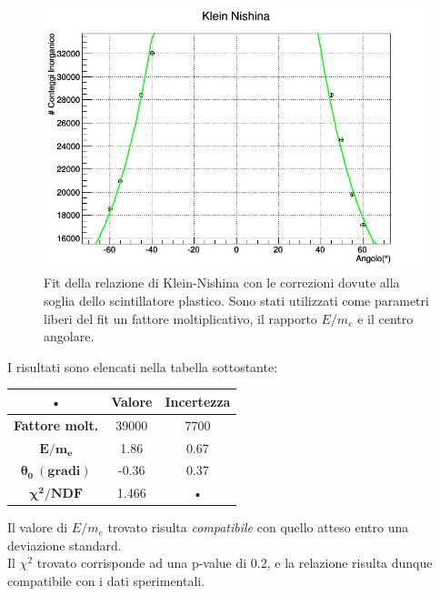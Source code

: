 \documentclass[8pt]{extarticle}
\begin{document}
\begin{figure}
\begin{center}
\includegraphics[scale=0.5]{klein_nishina_corretta}
\caption{Fit della relazione di Klein-Nishina con le correzioni dovute alla soglia dello scintillatore plastico. Sono stati utilizzati come parametri liberi del fit un fattore moltiplicativo, il rapporto $E/m_e$ e il centro angolare.}
\label{fig:KN_corr}
\end{center}
\end{figure}

I risultati sono elencati nella tabella sottostante: \\

\begin{center}
\begin{tabular}{|c|c|c|}
\hline 
• & \textbf{Valore} & \textbf{Incertezza} \\ 
\hline 
\textbf{Fattore molt.} & 39000 & 7700 \\ 
\hline 
$\mathbf{E/m_e}$ & 1.86 & 0.67 \\ 
\hline 
$\mathbf{\theta_0\ (gradi)}$ & -0.36 & 0.37 \\ 
\hline 
$\mathbf{\chi^2/NDF}$ & 1.466 & • \\ 
\hline 
\end{tabular} 
\end{center}

Il valore di $E/m_e$ trovato risulta \textit{compatibile} con quello atteso entro una deviazione standard. \\
Il $\chi^2$ trovato corrisponde ad una p-value di $0.2$, e la relazione risulta dunque compatibile con i dati sperimentali. \\
\end{document}
